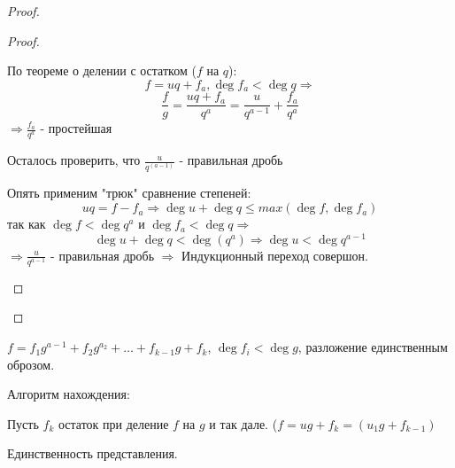 \begin{theorem}{}
\begin{proof}
\begin{proof}
\begin{description}
 По теореме о делении с остатком ($f$ на $q$):
$$f = uq + f_a, \deg f_a < \deg q \Rightarrow$$
$$\frac{f}{g} = \frac{uq+f_a}{q^a} = \frac{u}{q^{a-1}}+\frac{f_a}{q^a}$$
$\Rightarrow \frac{f_a}{q^a}$ - простейшая

Осталось проверить, что $\frac{u}{q^(a-1)}$  - правильная дробь

Опять применим "трюк" сравнение степеней:
$$u q = f - f_a \Rightarrow \deg u + \deg q \le max(\deg f, \deg f_a)$$
так как $\deg f < \deg q^a$ и $\deg f_a < \deg q \Rightarrow$
$$\deg u + \deg q < \deg (q^a) \Rightarrow \deg u < \deg q^{a - 1}$$
$\Rightarrow \frac{u}{q^{a-1}}$  - правильная дробь $\Rightarrow$
Индукционный переход совершон. 
\end{description}
\end{proof}
\end{proof}
\end{theorem}

\begin{Rem}
$f = f_1g^{a-1} + f_2 g^{a_2} + \dots + f_{k-1}g + f_k$,
$\deg f_i < \deg g$, разложение единственным оброзом.

Алгоритм нахождения:

Пусть $f_k$ остаток при деление $f$ на $g$ и так дале.
($f = ug + f_k = (u_1g + f_{k-1})$
\end{Rem}

\begin{theorem}{}
Единственность представления.
\end{theorem}

